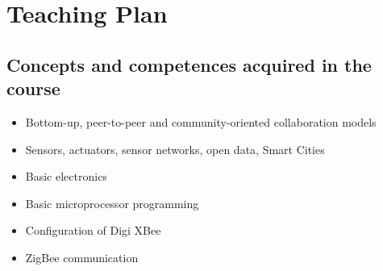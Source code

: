 \documentclass[a4paper,oneside]{book}   %
\begin{document}
% 
% 
% 




\section{Teaching Plan}

\subsection{Concepts and competences acquired in the course}
\begin{itemize}
\item Bottom-up, peer-to-peer and community-oriented collaboration models
\item Sensors, actuators, sensor networks, open data, Smart Cities
\item Basic electronics
\item Basic microprocessor programming
\item Configuration of Digi XBee
\item ZigBee communication
\end{itemize}
\end{document}
